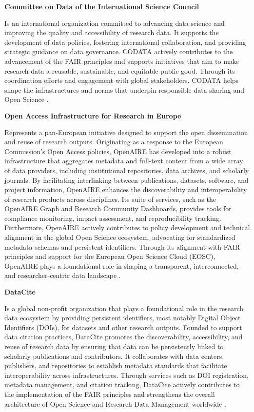 \documentclass[final]{rc-book-2.14}
\begin{document}
\textbf{Committee on Data of the International Science Council}

Is an international organization committed to advancing data science and improving the quality and accessibility of research data. It supports the development of data policies, fostering international collaboration, and providing strategic guidance on data governance. CODATA actively contributes to the advancement of the FAIR principles and supports initiatives that aim to make research data a reusable, sustainable, and equitable public good. Through its coordination efforts and engagement with global stakeholders, CODATA helps shape the infrastructures and norms that underpin responsible data sharing and Open Science \cite{codata_2024}.

\textbf{Open Access Infrastructure for Research in Europe}

Represents a pan-European initiative designed to support the open dissemination and reuse of research outputs. Originating as a response to the European Commission's Open Access policies, OpenAIRE has developed into a robust infrastructure that aggregates metadata and full-text content from a wide array of data providers, including institutional repositories, data archives, and scholarly journals. By facilitating interlinking between publications, datasets, software, and project information, OpenAIRE enhances the discoverability and interoperability of research products across disciplines. Its suite of services, such as the OpenAIRE Graph and Research Community Dashboards, provides tools for compliance monitoring, impact assessment, and reproducibility tracking. Furthermore, OpenAIRE actively contributes to policy development and technical alignment in the global Open Science ecosystem, advocating for standardized metadata schemas and persistent identifiers. Through its alignment with FAIR principles and support for the European Open Science Cloud (EOSC), OpenAIRE plays a foundational role in shaping a transparent, interconnected, and researcher-centric data landscape \cite{rettberg_openaire_2012}.

\textbf{DataCite}

Is a global non-profit organization that plays a foundational role in the research data ecosystem by providing persistent identifiers, most notably Digital Object Identifiers (DOIs), for datasets and other research outputs. Founded to support data citation practices, DataCite promotes the discoverability, accessibility, and reuse of research data by ensuring that data can be persistently linked to scholarly publications and contributors. It collaborates with data centers, publishers, and repositories to establish metadata standards that facilitate interoperability across infrastructures. Through services such as DOI registration, metadata management, and citation tracking, DataCite actively contributes to the implementation of the FAIR principles and strengthens the overall architecture of Open Science and Research Data Management worldwide \cite{brase_datacite_2009}.
\end{document}
